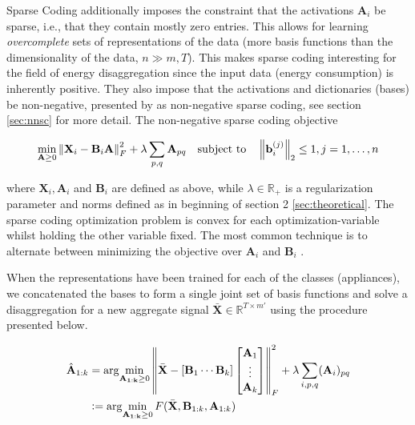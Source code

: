 Sparse Coding additionally imposes the constraint that the activations $\mathbf{A}_i$ be sparse, i.e., that they contain mostly zero entries. This allows for learning \textit{overcomplete} sets of representations of the data (more basis functions than the dimensionality of the data, $n \gg m,T$). This makes sparse coding interesting for the field of energy disaggregation since the input data (energy consumption) is inherently positive. They also impose that the activations and dictionaries (bases) be non-negative, presented by \cite{hoyer} as non-negative sparse coding, see section \ref{sec:nnsc} for more detail. The non-negative sparse coding objective

\begin{equation}
\min_{\mathbf{A} \geq 0} \left\lVert\mathbf{X}_i - \mathbf{B}_i\mathbf{A}\right\rVert_F^2 + \lambda \sum_{p,q} \mathbf{A}_{pq} \quad \text{subject to} \quad \left\lVert\mathbf{b}_i^{(j)}\right\rVert_2 \leq 1, j=1,\dots,n
\end{equation}

where $\mathbf{X}_i,\mathbf{A}_i$ and $\mathbf{B}_i$ are defined as above, while $\lambda \in \mathbb{R}_+$ is a regularization parameter and norms defined as in beginning of section 2 \ref{sec:theoretical}. The sparse coding optimization problem is convex for each optimization-variable whilst holding the other variable fixed. The most common technique is to alternate between minimizing the objective over $\mathbf{A}_i$ and $\mathbf{B}_i$ \cite{DDSC}.

When the representations have been trained for each of the classes (appliances), we concatenated the bases to form a single joint set of basis functions and solve a disaggregation for a new aggregate signal $\bar{\mathbf{X}} \in \mathbb{R}^{T\times m'}$ using the procedure presented below. 

\begin{equation}
\label{eq:f}
\begin{aligned}
\hat{\mathbf{A}}_{1:k}  & = \arg \! \min_{\mathbf{A_{1:k}} \geq 0} \left\lVert\bar{\mathbf{X}}-\left[\mathbf{B}_1 \cdots \mathbf{B}_k\right]  
		\begin{bmatrix}
		\mathbf{A}_1 \\
		\vdots \\
		\mathbf{A}_k
		 \end{bmatrix}
	\right\rVert_F^2 + \lambda \sum_{i,p,q}(\mathbf{A}_i)_{pq} \\
 & \vcentcolon= \arg \! \min_{\mathbf{A_{1:k}} \geq 0} F(\bar{\mathbf{X}},\mathbf{B}_{1:k},\mathbf{A}_{1:k})
\end{aligned}
\end{equation}

